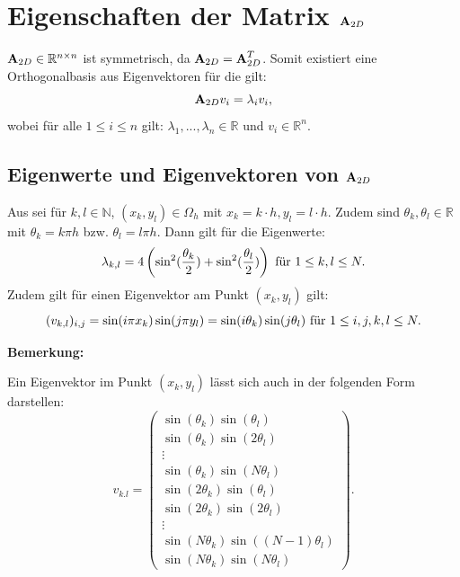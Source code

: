 \section{Eigenschaften der Matrix ${\textbf{A}}_{2D}$}\label{s.Eigenwerte und Eigenvektoren}

${\textbf{A}}_{2D} \in \mathbb{R}^{n \times n}$ ist symmetrisch, da ${\textbf{A}}_{2D} = {\textbf{A}}_{2D}^{T}$. Somit existiert eine Orthogonalbasis aus Eigenvektoren für die gilt:
\begin{equation}
{\textbf{A}}_{2D}v_{i} = \lambda_{i} v_{i},
\end{equation}
wobei für alle $1 \le i \le n$ gilt: $\lambda_{1},...,\lambda_{n} \in \mathbb{R}$ und $v_{i} \in \mathbb{R}^{n}$.

\subsection{Eigenwerte und Eigenvektoren von ${\textbf{A}}_{2D}$}\label{ss.Eigenwerte und Eigenvektoren}

Aus \cite{SAAD1} sei für $k,l \in \mathbb{N}$, $(x_{k},y_{l}) \in \Omega_{h}$ mit $x_{k} = k \cdot h, y_{l} = l \cdot h$. Zudem sind $\theta_{k}, \theta_{l} \in \mathbb{R}$ mit $\theta_{k} = k \pi h$ bzw. $\theta_{l} = l \pi h$. Dann gilt für die Eigenwerte:
\begin{equation}
\lambda_{k,l} = 4 \left(\sin^{2}(\frac {\theta_{k}} {2}) + \sin^{2}(\frac {\theta_{l}} {2}) \right) \textnormal{ für } 1 \le k,l \le N.\label{eq.Eigenwerte}
\end{equation}
Zudem gilt für einen Eigenvektor am Punkt $(x_{k},y_{l})$ gilt:
\begin{equation}
(v_{k,l})_{i,j} = \sin(i \pi x_{k}) \sin(j \pi y_{l}) = \sin(i\theta_{k}) \sin(j\theta_{l}) \textnormal{ für } 1 \le i,j,k,l \le N.
\end{equation}

\textbf{Bemerkung:}

Ein Eigenvektor im Punkt $(x_{k},y_{l})$ lässt sich auch in der folgenden Form darstellen:
\begin{equation}
v_{k.l} = 
\begin{pmatrix}
\sin(\theta_{k})\sin(\theta_{l})\\
\sin(\theta_{k})\sin(2 \theta_{l})\\
\vdots \\
\sin(\theta_{k})\sin(N \theta_{l})\\
\sin(2 \theta_{k})\sin(\theta_{l})\\
\sin(2 \theta_{k})\sin(2 \theta_{l})\\
\vdots\\
\sin(N \theta_{k})\sin((N-1) \theta_{l})\\
\sin(N \theta_{k})\sin(N \theta_{l})
\end{pmatrix}.
\end{equation}

